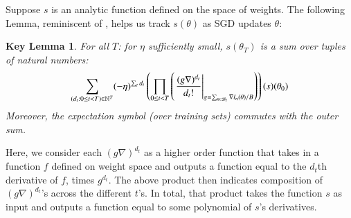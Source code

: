 \documentclass[anon,12pt]{colt2021} %
\newtheorem*{klem*}{Key Lemma}
\newcommand{\wrap}[1]{\left(#1\right)}
\newcommand{\Bb}{\mathcal{B}}
\begin{document}
        Suppose $s$ is an analytic function defined on the space of weights.
        The following Lemma, reminiscent of \cite{dy49a}, helps us track
        $s(\theta)$ as SGD updates $\theta$:
        \begin{klem*} \label{lem:dyson}
            For all $T$: for $\eta$ sufficiently small, $s(\theta_T)$ is a sum
            over tuples of natural numbers:
            \begin{equation}\label{eq:dyson2}
                \sum_{(d_t: 0\leq t<T) \in \NN^T}
                (-\eta)^{\sum_t d_t}
                \wrap{
                    \prod_{0 \leq t < T}
                        \wrap{\left.
                            \frac{(g \nabla)^{d_t}}{d_t!}
                        \right|_{g = \sum_{n\in \Bb_t} \nabla l_n(\theta) / B}}
                }(s) (\theta_0)
            \end{equation}
            Moreover, the expectation symbol (over training sets) commutes with
            the outer sum.
        \end{klem*}
        Here, we consider each $(g \nabla)^{d_t}$ as a higher order function
        that takes in a function $f$ defined on weight space and outputs a
        function equal to the $d_t$th derivative of $f$, times $g^{d_t}$.
        The above product then indicates composition of $(g \nabla)^{d_t}$'s
        across the different $t$'s.  In total, that product takes the function
        $s$ as input and outputs a function equal to some polynomial of $s$'s
        derivatives.
\end{document}
